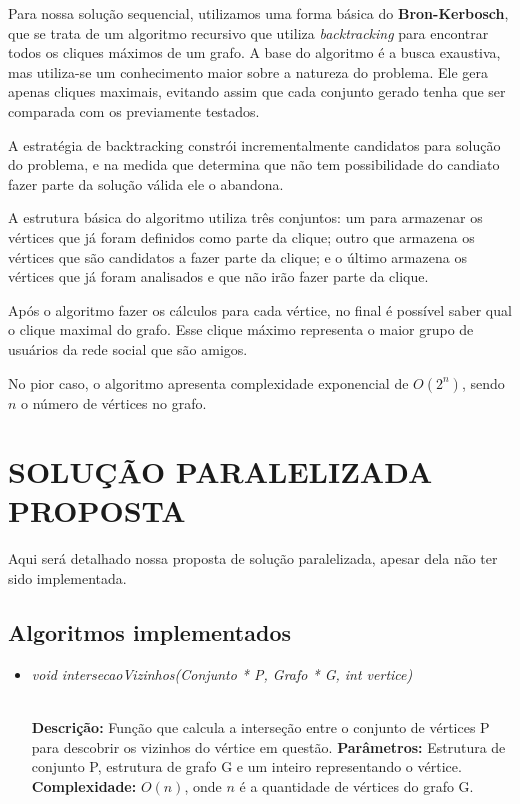 \documentclass[12pt]{article}
\begin{document}
Para nossa solução sequencial, utilizamos uma forma básica do \textbf{Bron-Kerbosch}, que se trata de um algoritmo recursivo que utiliza \textit{backtracking} para encontrar todos os cliques máximos de um grafo. A base do algoritmo é a busca exaustiva, mas utiliza-se um conhecimento maior sobre a natureza do problema. Ele gera apenas cliques maximais, evitando assim que cada conjunto gerado tenha que ser comparada com os previamente testados. \cite{bron}

A estratégia de backtracking constrói incrementalmente candidatos para solução do problema, e na medida que determina que não tem possibilidade do candiato fazer parte da solução válida ele o abandona. \cite{wikiback}

A estrutura básica do algoritmo utiliza três conjuntos: um para armazenar os vértices que já foram definidos como parte da clique; outro que armazena os vértices que são candidatos a fazer parte da clique; e o último armazena os vértices que já foram analisados e que não irão fazer parte da clique.

Após o algoritmo fazer os cálculos para cada vértice, no final é possível saber qual o clique maximal do grafo. Esse clique máximo representa o maior grupo de usuários da rede social que são amigos.

No pior caso, o algoritmo apresenta complexidade exponencial de $O(2^n)$, sendo $n$ o número de vértices no grafo.

\section{SOLUÇÃO PARALELIZADA PROPOSTA}
\label{solucao_paralelizada_proposta}

Aqui será detalhado nossa proposta de solução paralelizada, apesar dela não ter sido implementada.


\subsection{Algoritmos implementados}

\vspace{0.2 true cm}

\begin{itemize}
 \item \begin{large}\textit{void intersecaoVizinhos(Conjunto * P, Grafo * G, int vertice)}\end{large}\\
 \subitem \textbf{Descrição:} Função que calcula a interseção entre o conjunto de vértices P para descobrir os vizinhos do vértice em questão.
 \subitem \textbf{Parâmetros:} Estrutura de conjunto P, estrutura de grafo G e um inteiro representando o vértice.
 \subitem \textbf{Complexidade:} $O(n)$, onde $n$ é a quantidade de vértices do grafo G.
\end{itemize}
\end{document}
